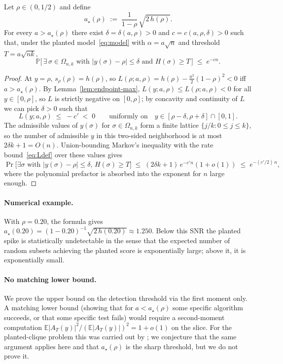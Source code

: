 \begin{theorem}\label{thm:detect}
Let $\rho\in(0,1/2)$ and define
\begin{equation}\label{eq:adetect}
a_\star(\rho) \;:=\; \frac{1}{1-\rho}\,\sqrt{2\,h(\rho)}.
\end{equation}
For every $a > a_\star(\rho)$ there exist $\delta=\delta(a,\rho)>0$ and
$c=c(a,\rho,\delta)>0$ such that, under the planted model~\eqref{eq:model} with
$\alpha=a\sqrt n$ and threshold $T=a\sqrt{nk}$,
\[
\mathbb P\bigl[\,\exists\,\sigma\in\Omega_{n,k}\text{ with } |y(\sigma)-\rho|\le \delta
\text{ and } H(\sigma)\ge T\,\bigr]\;\le\; e^{-c n}.
\]
\end{theorem}
\begin{proof}
At $y=\rho$, $s_\rho(\rho)=h(\rho)$, so $L(\rho;a,\rho)=h(\rho)-\tfrac{a^2}{2}(1-\rho)^2<0$
iff $a>a_\star(\rho)$. By Lemma~\ref{lem:endpoint-max}, $L(y;a,\rho)\le L(\rho;a,\rho)<0$
for all $y\in[0,\rho]$, so $L$ is strictly negative on $[0,\rho]$; by concavity and
continuity of $L$ we can pick $\delta>0$ such that
\[
L(y;a,\rho)\;\le\;-c'\;<\;0 \qquad \text{uniformly on}\quad
y\in[\rho-\delta,\rho+\delta]\cap[0,1].
\]
The admissible values of $y(\sigma)$ for $\sigma\in\Omega_{n,k}$ form a finite lattice
$\{j/k:0\le j\le k\}$, so the number of admissible $y$ in this two-sided neighborhood is
at most $2\delta k + 1 = O(n)$. Union-bounding Markov's inequality with the rate
bound~\eqref{eq:Ldef} over these values gives
\[
\Pr\!\bigl[\exists \sigma \text{ with } |y(\sigma)-\rho|\le\delta,\, H(\sigma)\ge T\bigr]
  \;\le\; (2\delta k+1)\,e^{-c' n}(1+o(1))
  \;\le\; e^{-(c'/2)\,n},
\]
where the polynomial prefactor is absorbed into the exponent for $n$ large enough.
\end{proof}

\paragraph{Numerical example.} With $\rho=0.20$, the formula gives
$a_\star(0.20)=(1-0.20)^{-1}\sqrt{2\,h(0.20)}\approx 1.250$. Below this SNR the planted
spike is statistically undetectable in the sense that the expected number of random
subsets achieving the planted score is exponentially large; above it, it is
exponentially small.

\paragraph{No matching lower bound.} We prove the upper bound on the detection threshold
via the first moment only. A matching lower bound (showing that for $a<a_\star(\rho)$
some specific algorithm succeeds, or that some specific test fails) would require a
second-moment computation $\mathbb E|A_T(y)|^2/(\mathbb E|A_T(y)|)^2 = 1+o(1)$ on the
slice. For the planted-clique problem this was carried out by
\cite{gamarnik-zadik-clique}; we conjecture that the same argument applies here and
that $a_\star(\rho)$ is the sharp threshold, but we do not prove it.

